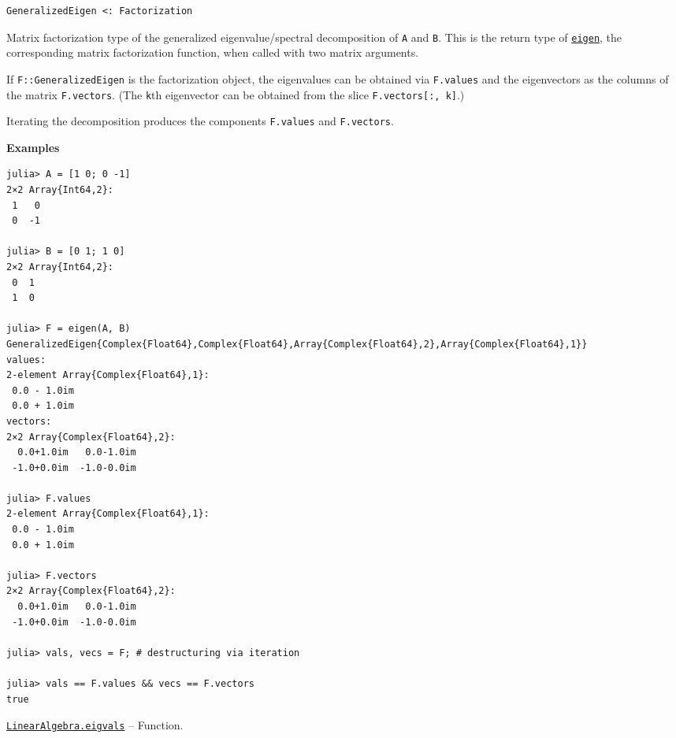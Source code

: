 \begin{adjustwidth}{2em}{0pt}


\begin{verbatim}
GeneralizedEigen <: Factorization
\end{verbatim}

Matrix factorization type of the generalized eigenvalue/spectral decomposition of \texttt{A} and \texttt{B}. This is the return type of \hyperlink{11056016707394839114}{\texttt{eigen}}, the corresponding matrix factorization function, when called with two matrix arguments.

If \texttt{F::GeneralizedEigen} is the factorization object, the eigenvalues can be obtained via \texttt{F.values} and the eigenvectors as the columns of the matrix \texttt{F.vectors}. (The \texttt{k}th eigenvector can be obtained from the slice \texttt{F.vectors[:, k]}.)

Iterating the decomposition produces the components \texttt{F.values} and \texttt{F.vectors}.

\textbf{Examples}


\begin{verbatim}
julia> A = [1 0; 0 -1]
2×2 Array{Int64,2}:
 1   0
 0  -1

julia> B = [0 1; 1 0]
2×2 Array{Int64,2}:
 0  1
 1  0

julia> F = eigen(A, B)
GeneralizedEigen{Complex{Float64},Complex{Float64},Array{Complex{Float64},2},Array{Complex{Float64},1}}
values:
2-element Array{Complex{Float64},1}:
 0.0 - 1.0im
 0.0 + 1.0im
vectors:
2×2 Array{Complex{Float64},2}:
  0.0+1.0im   0.0-1.0im
 -1.0+0.0im  -1.0-0.0im

julia> F.values
2-element Array{Complex{Float64},1}:
 0.0 - 1.0im
 0.0 + 1.0im

julia> F.vectors
2×2 Array{Complex{Float64},2}:
  0.0+1.0im   0.0-1.0im
 -1.0+0.0im  -1.0-0.0im

julia> vals, vecs = F; # destructuring via iteration

julia> vals == F.values && vecs == F.vectors
true
\end{verbatim}



\end{adjustwidth}
\hypertarget{12334018763942871611}{} 
\hyperlink{12334018763942871611}{\texttt{LinearAlgebra.eigvals}}  -- {Function.}

